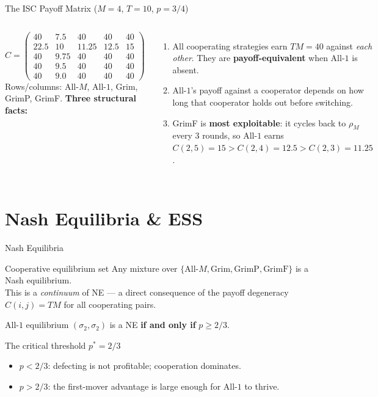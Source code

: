 \documentclass[aspectratio=169]{beamer}
\begin{document}
\begin{frame}{The ISC Payoff Matrix ($M{=}4$, $T{=}10$, $p{=}3/4$)}
  \begin{columns}
      \[
      C =
      \begin{pmatrix}
        40   & 7.5  & 40    & 40   & 40 \\
        22.5 & 10   & 11.25 & 12.5 & 15 \\
        40   & 9.75 & 40    & 40   & 40 \\
        40   & 9.5  & 40    & 40   & 40 \\
        40   & 9.0  & 40    & 40   & 40
      \end{pmatrix}
      \]
      Rows/columns: All-$M$, All-$1$, Grim, GrimP, GrimF.
      \textbf{Three structural facts:}
      \begin{enumerate}
        \item All cooperating strategies earn $TM = 40$ against \emph{each other}. They are \textbf{payoff-equivalent} when All-$1$ is absent.
        \item All-$1$'s payoff against a cooperator depends on how long that cooperator holds out before switching.
        \item GrimF is \textbf{most exploitable}: it cycles back to $\rho_M$ every 3 rounds, so All-$1$ earns $C(2,5)=15 > C(2,4)=12.5 > C(2,3)=11.25$.
      \end{enumerate}
  \end{columns}
\end{frame}

\section{Nash Equilibria \& ESS}

\begin{frame}{Nash Equilibria}
  \begin{block}{Cooperative equilibrium set}
    Any mixture over $\{\text{All-}M, \text{Grim}, \text{GrimP}, \text{GrimF}\}$ is a Nash equilibrium.\\
    This is a \emph{continuum} of NE --- a direct consequence of the payoff degeneracy $C(i,j)=TM$ for all cooperating pairs.
  \end{block}

  \begin{block}{All-$1$ equilibrium}
    $(\sigma_2, \sigma_2)$ is a NE \textbf{if and only if} $p \geq 2/3$.
  \end{block}

  \begin{alertblock}{The critical threshold $p^* = 2/3$}
    \begin{itemize}
      \item $p < 2/3$: defecting is not profitable; cooperation dominates.
      \item $p > 2/3$: the first-mover advantage is large enough for All-$1$ to thrive.
    \end{itemize}
  \end{alertblock}
\end{frame}
\end{document}
